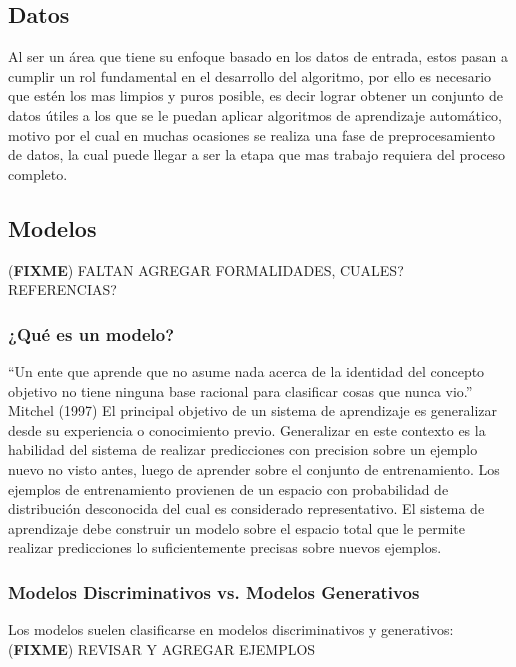 \documentclass[a4paper,11pt,spanish]{book}
\newcommand*{\FIXME}[1]{{(\textbf{FIXME}) {#1}}}
\begin{document}
    \subsection{Datos}
      Al ser un área que tiene su enfoque basado en los datos de entrada, estos pasan a cumplir un rol fundamental en el desarrollo del algoritmo, por ello es necesario que 
      estén los mas limpios y puros posible, es decir lograr obtener un conjunto de datos útiles a los que se le puedan aplicar algoritmos de aprendizaje automático, 
      motivo por el cual en muchas ocasiones se realiza una fase de preprocesamiento de datos, la cual puede llegar a ser la etapa que mas trabajo requiera del proceso completo. 

    \subsection{Modelos}
      \FIXME{FALTAN AGREGAR FORMALIDADES, CUALES? REFERENCIAS?}
      \subsubsection{¿Qué es un modelo?}
	“Un ente que aprende que no asume nada acerca de la identidad del concepto objetivo no tiene ninguna base racional para clasificar cosas que nunca vio.”
	Mitchel (1997)
	El principal objetivo de un sistema de aprendizaje es generalizar desde su experiencia o conocimiento previo. Generalizar en este contexto es la habilidad del sistema de realizar
	predicciones con precision sobre un ejemplo nuevo no visto antes, luego de aprender sobre el conjunto de entrenamiento. Los ejemplos de entrenamiento provienen de un espacio 
	con probabilidad de distribución desconocida del cual es considerado representativo. El sistema de aprendizaje debe construir un modelo sobre el espacio total que le permite realizar
	predicciones lo suficientemente precisas sobre nuevos ejemplos. 
	
      \subsubsection{Modelos Discriminativos vs. Modelos Generativos}
	Los modelos suelen clasificarse en modelos discriminativos y generativos:
	\FIXME{REVISAR Y AGREGAR EJEMPLOS}
\end{document}
